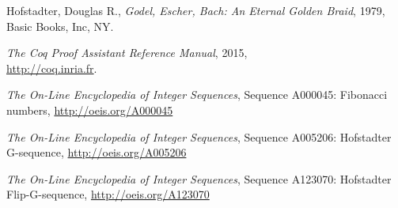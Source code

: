 \documentclass[a4paper,11pt]{article}
\begin{document}
\begin{thebibliography}{1}
 Hofstadter, Douglas R.,
 {\it Godel, Escher, Bach: An Eternal Golden Braid},
 1979, Basic Books, Inc, NY.

 {\it The Coq Proof Assistant Reference Manual}, 2015,\\
 \mbox{\url{http://coq.inria.fr}}.

 {\it The On-Line Encyclopedia of Integer Sequences}, Sequence
 A000045: Fibonacci numbers, \url{http://oeis.org/A000045}

 {\it The On-Line Encyclopedia of Integer Sequences}, Sequence
 A005206: Hofstadter G-sequence, \url{http://oeis.org/A005206}

 {\it The On-Line Encyclopedia of Integer Sequences}, Sequence
 A123070: Hofstadter Flip-G-sequence, \url{http://oeis.org/A123070}

\end{thebibliography}
\end{document}
